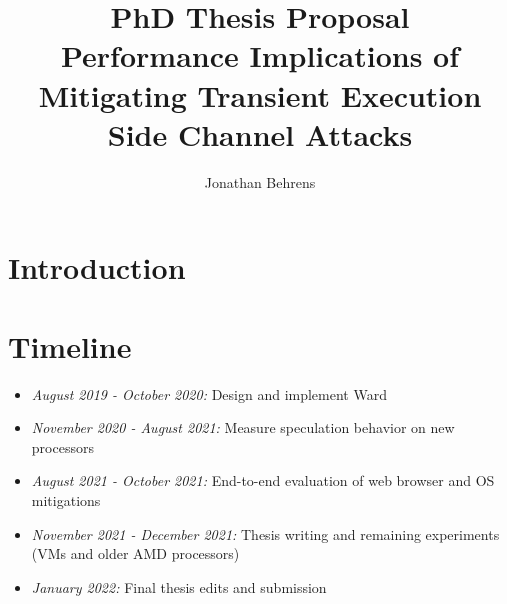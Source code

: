 \documentclass[letterpaper,12pt]{article}
\begin{document}

\date{\vspace{-\baselineskip}}
\title{\bf PhD Thesis Proposal \\ \large Performance Implications of Mitigating Transient Execution Side Channel Attacks}
\author{ {\rm Jonathan Behrens} }
\maketitle

\section{Introduction}


\newpage
\section{Timeline}
\begin{itemize}
\item\textit{August 2019 - October 2020:} Design and implement Ward
\item\textit{November 2020 - August 2021:} Measure speculation behavior on new processors
\item\textit{August 2021 - October 2021:} End-to-end evaluation of web browser and OS mitigations
\item\textit{November 2021 - December 2021:} Thesis writing and remaining experiments (VMs and older AMD processors)
\item\textit{January 2022:} Final thesis edits and submission
\end{itemize}

\pagebreak
{}

\end{document}
